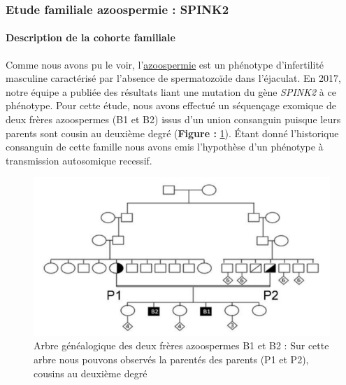 \documentclass[12pt,twoside]{reedthesis}
\theoremstyle{definition}
\theoremstyle{definition}
\theoremstyle{remark}
\begin{document}
  \newpage  
  
  \hypertarget{spink2}{\subsubsection{Etude familiale azoospermie :
  SPINK2}\label{spink2}}
  
  \paragraph{Description de la cohorte
  familiale}\label{description-de-la-cohorte-familiale}
  
  Comme nous avons pu le voir, l'\protect\hyperlink{infquant}{azoospermie}
  est un phénotype d'infertilité masculine caractérisé par l'absence de
  spermatozoïde dans l'éjaculat. En 2017, notre équipe a publiée des
  résultats liant une mutation du gène \emph{SPINK2} à ce phénotype. Pour
  cette étude, nous avons effectué un séquençage exomique de deux frères
  azoospermes (B1 et B2) issus d'un union consanguin puisque leurs parents
  sont cousin au deuxième degré (\textbf{Figure : }\ref{fig:spink2tree}).
  Étant donné l'historique consanguin de cette famille nous avons emis
  l'hypothèse d'un phénotype à transmission autosomique recessif.
  
  \begin{figure}
  
  {\centering \includegraphics[scale=0.75]{figure/spink2_arbre_genealogique} 
  
  }
  
  \caption[Arbre généalogique des deux frères azoospermes B1 et B2]{Arbre généalogique des deux frères azoospermes B1 et B2 : Sur cette arbre nous pouvons observés la parentés des parents (P1 et P2), cousins au deuxième degré}\label{fig:spink2tree}
  \end{figure}
  
\end{document}
